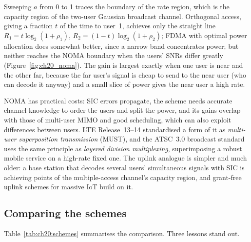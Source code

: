 Sweeping $a$ from 0 to 1 traces the boundary of the rate region, which is the capacity region of
the two-user Gaussian broadcast channel. Orthogonal access, giving a fraction $t$ of the time to
user~1, achieves only the straight line $R_1=t\log_2(1+\rho_1)$, $R_2=(1-t)\log_2(1+\rho_2)$; FDMA with
optimal power allocation does somewhat better, since a narrow band concentrates power; but neither
reaches the NOMA boundary when the users' SNRs differ greatly (Figure~\ref{fig:ch20_noma}). The gain
is largest exactly when one user is near and the other far, because the far user's signal is
cheap to send to the near user (who can decode it anyway) and a small slice of power gives the near
user a high rate.


NOMA has practical costs: SIC errors propagate, the scheme needs accurate channel knowledge to
order the users and split the power, and its gains overlap with those of multi-user MIMO and
good scheduling, which can also exploit differences between users. LTE Release~13--14 standardised
a form of it as \emph{multi-user superposition transmission} (MUST), and the ATSC~3.0 broadcast standard
uses the same principle as \emph{layered division multiplexing}, superimposing a robust mobile service
on a high-rate fixed one. The uplink analogue is simpler and much older: a base station that
decodes several users' simultaneous signals with SIC is achieving points of the multiple-access
channel's capacity region, and grant-free uplink schemes for massive IoT build on it.

\subsection{Comparing the schemes}

Table~\ref{tab:ch20:schemes} summarises the comparison. Three lessons stand out.

